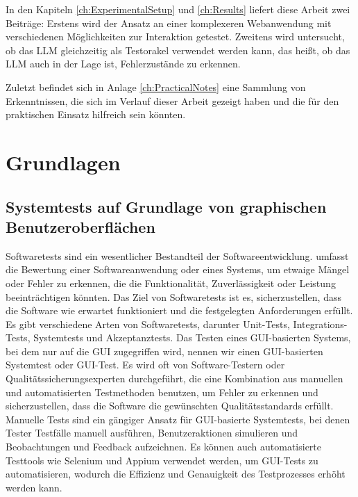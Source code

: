In den Kapiteln \ref{ch:ExperimentalSetup} und \ref{ch:Results} liefert diese Arbeit zwei Beiträge:
Erstens wird der Ansatz an einer komplexeren Webanwendung mit verschiedenen Möglichkeiten zur Interaktion getestet.
Zweitens wird untersucht, ob das LLM gleichzeitig als Testorakel verwendet werden kann, das heißt, ob das LLM auch in der Lage ist, Fehlerzustände zu erkennen.


Zuletzt befindet sich in Anlage \ref{ch:PracticalNotes} eine Sammlung von Erkenntnissen, die sich im Verlauf dieser Arbeit gezeigt haben und die für den praktischen Einsatz hilfreich sein könnten.



\chapter{Grundlagen}
\label{ch:Foundations}

\section{Systemtests auf Grundlage von graphischen Benutzeroberflächen}
\label{sec:Foundations:GUIBasedSystemTests}
Softwaretests sind ein wesentlicher Bestandteil der Softwareentwicklung.
 umfasst die Bewertung einer Softwareanwendung oder eines Systems, um etwaige Mängel oder Fehler zu erkennen, die die Funktionalität, Zuverlässigkeit oder Leistung beeinträchtigen könnten.
Das Ziel von Softwaretests ist es, sicherzustellen, dass die Software wie erwartet funktioniert und die festgelegten Anforderungen erfüllt.
Es gibt verschiedene Arten von Softwaretests, darunter Unit-Tests, Integrations-Tests, Systemtests und Akzeptanztests.
Das Testen eines GUI-basierten Systems, bei dem nur auf die GUI zugegriffen wird, nennen wir einen GUI-basierten Systemtest oder GUI-Test.
Es wird oft von Software-Testern oder Qualitätssicherungsexperten durchgeführt, die eine Kombination aus manuellen und automatisierten Testmethoden benutzen, um Fehler zu erkennen und sicherzustellen, dass die Software die gewünschten Qualitätsstandards erfüllt.
Manuelle Tests sind ein gängiger Ansatz für GUI-basierte Systemtests, bei denen Tester Testfälle manuell ausführen, Benutzeraktionen simulieren und Beobachtungen und Feedback aufzeichnen.
Es können auch automatisierte Testtools wie Selenium und Appium verwendet werden, um GUI-Tests zu automatisieren, wodurch die Effizienz und Genauigkeit des Testprozesses erhöht werden kann.

